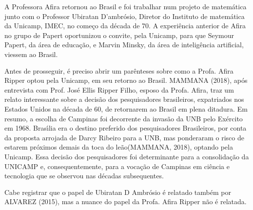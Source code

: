 \documentclass[
12pt,		%
openright,	%
twoside,  %
a4paper,			%
chapter=TITLE,		%
english,			%
french,				%
spanish,			%
brazil				%
]{USPSC-classe/USPSC}
\begin{document}
A Professora Afira retornou ao Brasil e foi trabalhar num projeto de matem\'atica junto com o Professor Ubiratan D’ambr\'osio, Diretor do Instituto de matem\'atica da Unicamp, IMEC, no come\c{c}o da d\'ecada de 70. A experi\^encia anterior de Afira no grupo de Papert oportunizou o convite, pela Unicamp, para que Seymour Papert, da \'area de educa\c{c}\~ao, e Marvin Minsky, da \'area de intelig\^encia artificial, viessem ao Brasil.

















Antes de prosseguir, \'e preciso abrir um par\^enteses sobre como a Profa. Afira Ripper optou pela Unicamp, em seu retorno ao Brasil.  MAMMANA (2018), ap\'os entrevista com Prof. Jos\'e Ellis Ripper Filho, esposo da Profa. Afira, traz um relato interessante sobre a decis\~ao dos pesquisadores brasileiros, expatriados nos Estados Unidos na d\'ecada de 60, de retornarem ao Brasil em plena ditadura. Em resumo, a escolha de Campinas foi decorrente da invas\~ao da UNB pelo Ex\'ercito em 1968. Bras\'{\i}lia era o destino preferido dos pesquisadores Brasileiros, por conta da proposta arrojada de Darcy Ribeiro para a UNB, mas ponderaram o risco de estarem pr\'oximos demais da \textquotedbl toca do le\~ao\textquotedbl   (MAMMANA, 2018), optando pela Unicamp. Essa decis\~ao dos pesquisadores foi determinante para a consolida\c{c}\~ao da UNICAMP e, consequentemente, para a voca\c{c}\~ao de Campinas em ci\^encia e tecnologia que se observou nas d\'ecadas subsequentes.

















Cabe registrar que o papel de Ubiratan D Ambr\'osio \'e relatado tamb\'em por ALVAREZ (2015), mas a nuance do papel da Profa. Afira Ripper n\~ao \'e relatada.
\end{document}
